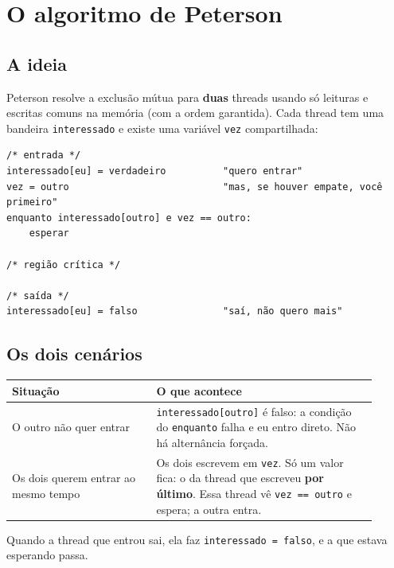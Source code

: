\documentclass[11pt,a4paper]{article}
\newcommand{\raiz}{../../../..}
\newcommand{\cmd}[1]{\texttt{#1}}
\begin{document}


\section{O algoritmo de Peterson}

\subsection{A ideia}

Peterson resolve a exclusão mútua para \textbf{duas} threads usando só leituras e escritas comuns na memória (com a ordem garantida). Cada thread tem uma bandeira \cmd{interessado} e existe uma variável \cmd{vez} compartilhada:

\begin{lstlisting}[style=terminal]
/* entrada */
interessado[eu] = verdadeiro          "quero entrar"
vez = outro                           "mas, se houver empate, você primeiro"
enquanto interessado[outro] e vez == outro:
    esperar

/* região crítica */

/* saída */
interessado[eu] = falso               "saí, não quero mais"
\end{lstlisting}

\subsection{Os dois cenários}

\begin{center}
\begin{tabular}{@{}R{0.36\linewidth}R{0.55\linewidth}@{}}
\toprule
\textbf{Situação} & \textbf{O que acontece} \\
\midrule
O outro não quer entrar & \cmd{interessado[outro]} é falso: a condição do \cmd{enquanto} falha e eu entro direto. Não há alternância forçada. \\
Os dois querem entrar ao mesmo tempo & Os dois escrevem em \cmd{vez}. Só um valor fica: o da thread que escreveu \textbf{por último}. Essa thread vê \cmd{vez == outro} e espera; a outra entra. \\
\bottomrule
\end{tabular}
\end{center}

Quando a thread que entrou sai, ela faz \cmd{interessado = falso}, e a que estava esperando passa.
\end{document}
